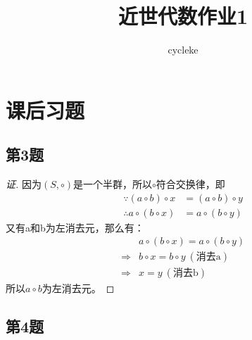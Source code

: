 \documentclass[11pt]{article}
\title{近世代数作业1}
\author{cycleke}
\begin{document}
\maketitle
\tableofcontents\clearpage
\pagestyle{fancy}
\lfoot{}
\cfoot{\thepage}\rfoot{}
\setcounter{section}{0}
\setcounter{page}{1}
\clearpage

\section{课后习题}

\subsection{第3题}
\begin{proof}[证]
  因为$(S,\circ)$是一个半群，所以$\circ$符合交换律，即
  \begin{align*}
    \because (a \circ b) \circ x &= (a \circ b) \circ y \\
    \therefore a \circ (b \circ x) &= a \circ (b \circ y)
  \end{align*}
  又有a和b为左消去元，那么有：
  \begin{align*}
    &a \circ (b \circ x) = a \circ (b \circ y) \\
    \Rightarrow &b \circ x = b \circ y \ (\text{消去a}) \\
    \Rightarrow &x = y \ (\text{消去b})
  \end{align*}
  所以$a \circ b$为左消去元。
\end{proof}

\subsection{第4题}
\end{document}
